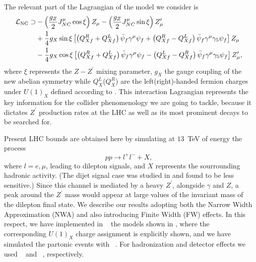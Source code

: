 The relevant part of the Lagrangian of the model we consider is
\begin{eqnarray}
\mathcal{L_{\rm NC}} \supset & - \left(\frac{g_Z}{2} J_{NC}^\mu \cos \xi \right) Z_\mu- \left(\frac{g_Z}{2} J_{NC}^\mu \sin \xi \right) Z^\prime_\mu \\
& + \frac{1}{4} g_X \sin \xi \left[ \left( Q_{Xf} ^R + Q_{Xf} ^L \right) \bar{\psi} _f \gamma ^\mu \psi _f + \left( Q_{Xf} ^R - Q_{Xf} ^L \right) \bar{\psi} _f \gamma ^\mu \gamma _5 \psi _f \right] Z_\mu \\
& - \frac{1}{4} g_X \cos \xi \left[ \left( Q_{Xf} ^R + Q_{Xf} ^L \right) \bar{\psi} _f \gamma ^\mu \psi _f - \left( Q_{Xf} ^L - Q_{Xf} ^R \right) \bar{\psi} _f \gamma ^\mu \gamma _5 \psi _f \right] Z' _\mu,
\label{eq:LNC1}
\end{eqnarray}
%
where $\xi$ represents the $Z-Z^\prime$ mixing parameter, $g_X$ the gauge coupling of the new abelian symmetry while 
$Q^L_X$($Q^R_X$) are the left(right)-handed fermion charges under $U(1)_X$ 
defined according to . This interaction Lagrangian
represents the key information for the collider phenomenology we are going to tackle, 
because it dictates $Z^\prime$ production rates at the LHC as well as its most prominent decays to be searched for.


Present LHC bounds are obtained here by simulating at $13$~TeV of \com energy the process
%
\begin{equation}
pp\rightarrow l^+l^- +X,
\end{equation}
%
where $l=e,\mu$, leading to dilepton signals, and $X$ represents the sourrounding hadronic activity. (The dijet signal case was studied in  and found to be less sensitive.) 
Since this channel is mediated by a heavy $Z^\prime$, alongside $\gamma$ and $Z$, a peak 
around the $Z^\prime$ mass would appear at large values of the invariant mass of the dilepton final state. 
We describe our results adopting both the Narrow Width Approximation (NWA) and also introducing Finite Width (FW) effects. 
In this respect, we have implemented in \feynrules~\cite{Alloul:2013bka} the models shown in , where the corresponding $U(1)_X$ charge assignment is explicitly shown,
and we have simulated the partonic events with \MGvATNLO~\cite{Alwall:2011uj}. For hadronization and detector effects we used ~\cite{Sjostrand:2007gs} and \delphes~\cite{deFavereau:2013fsa}, respectively.

